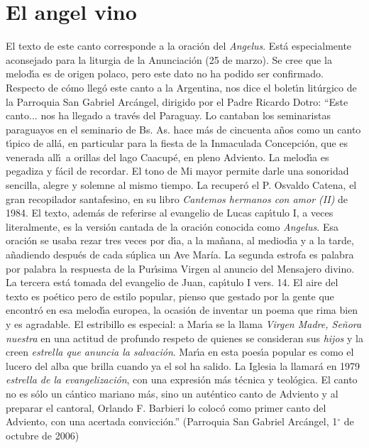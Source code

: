 \documentclass[landscape,12pt]{report}
\begin{document}
\section*{\small El angel vino} \noindent\footnotesize El texto de este canto corresponde a la oraci\'on del \textit{Angelus}. Est\'a especialmente aconsejado para la liturgia de la Anunciaci\'on (25 de marzo). Se cree que la melod\'\i a es de origen polaco, pero este dato no ha podido ser confirmado. Respecto de c\'omo lleg\'o este canto a la Argentina, nos dice el bolet\'\i n lit\'urgico de la Parroquia San Gabriel Arc\'angel, dirigido por el Padre Ricardo Dotro: ``Este canto... nos ha llegado a trav\'es del Paraguay. Lo cantaban los seminaristas paraguayos en el seminario de Bs. As. hace m\'as de cincuenta a\~nos como un canto t\'\i pico de all\'a, en particular para la fiesta de la Inmaculada Concepción, que es venerada all\'\i\ a orillas del lago Caacup\'e, en pleno Adviento. La melod\'\i a es pegadiza y f\'acil de recordar. El tono de Mi mayor permite darle una sonoridad sencilla, alegre y solemne al mismo tiempo. La recuper\'o el P. Osvaldo Catena, el gran recopilador santafesino, en su libro \textit{
Cantemos hermanos con amor (II)} de 1984. El texto, adem\'as de referirse al evangelio de Lucas cap\'\i tulo I, a veces literalmente, es la versi\'on cantada de la oraci\'on conocida como \textit{Angelus}. Esa oraci\'on se usaba rezar tres veces por d\'\i a, a la ma\~nana, al mediod\'\i a y a la tarde, a\~nadiendo despu\'es de cada s\'uplica un Ave María. La segunda estrofa es palabra por palabra la respuesta de la Pur\'\i sima Virgen al anuncio del Mensajero divino. La tercera est\'a tomada del evangelio de Juan, cap\'\i tulo I vers. 14. El aire del texto es po\'etico pero de estilo popular, pienso que gestado por la gente que encontr\'o en esa melod\'\i a europea, la ocasi\'on de inventar un poema que rima bien y es agradable. El estribillo es especial: a Mar\'\i a se la llama \textit{Virgen Madre, Se\~nora nuestra} en una actitud de profundo respeto de quienes se consideran sus \textit{hijos} y la creen \textit{estrella que anuncia la salvaci\'on}. Mar\'\i a en esta poes\'\i a popular es como el lucero 
del alba que brilla cuando ya el sol ha salido. La Iglesia la llamar\'a en 1979 \textit{estrella de la evangelización}, con una expresi\'on m\'as t\'ecnica y teol\'ogica. El canto no es s\'olo un c\'antico mariano m\'as, sino un aut\'entico canto de Adviento y al preparar el cantoral, Orlando F. Barbieri lo coloc\'o como primer canto del Adviento, con una acertada convicci\'on.'' (Parroquia San Gabriel Arc\'angel, 1$^\circ$ de octubre de 2006)
\end{document}
